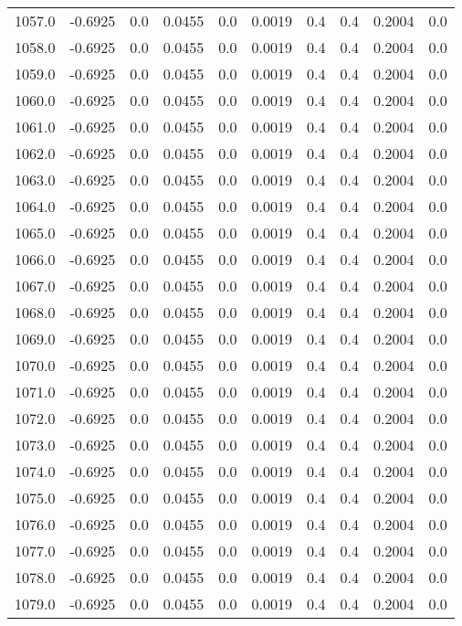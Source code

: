 \begin{longtable}{lrrrrrrrrr}
1057.0 & -0.6925 & 0.0 & 0.0455 & 0.0 & 0.0019 & 0.4 & 0.4 & 0.2004 & 0.0 \\
1058.0 & -0.6925 & 0.0 & 0.0455 & 0.0 & 0.0019 & 0.4 & 0.4 & 0.2004 & 0.0 \\
1059.0 & -0.6925 & 0.0 & 0.0455 & 0.0 & 0.0019 & 0.4 & 0.4 & 0.2004 & 0.0 \\
1060.0 & -0.6925 & 0.0 & 0.0455 & 0.0 & 0.0019 & 0.4 & 0.4 & 0.2004 & 0.0 \\
1061.0 & -0.6925 & 0.0 & 0.0455 & 0.0 & 0.0019 & 0.4 & 0.4 & 0.2004 & 0.0 \\
1062.0 & -0.6925 & 0.0 & 0.0455 & 0.0 & 0.0019 & 0.4 & 0.4 & 0.2004 & 0.0 \\
1063.0 & -0.6925 & 0.0 & 0.0455 & 0.0 & 0.0019 & 0.4 & 0.4 & 0.2004 & 0.0 \\
1064.0 & -0.6925 & 0.0 & 0.0455 & 0.0 & 0.0019 & 0.4 & 0.4 & 0.2004 & 0.0 \\
1065.0 & -0.6925 & 0.0 & 0.0455 & 0.0 & 0.0019 & 0.4 & 0.4 & 0.2004 & 0.0 \\
1066.0 & -0.6925 & 0.0 & 0.0455 & 0.0 & 0.0019 & 0.4 & 0.4 & 0.2004 & 0.0 \\
1067.0 & -0.6925 & 0.0 & 0.0455 & 0.0 & 0.0019 & 0.4 & 0.4 & 0.2004 & 0.0 \\
1068.0 & -0.6925 & 0.0 & 0.0455 & 0.0 & 0.0019 & 0.4 & 0.4 & 0.2004 & 0.0 \\
1069.0 & -0.6925 & 0.0 & 0.0455 & 0.0 & 0.0019 & 0.4 & 0.4 & 0.2004 & 0.0 \\
1070.0 & -0.6925 & 0.0 & 0.0455 & 0.0 & 0.0019 & 0.4 & 0.4 & 0.2004 & 0.0 \\
1071.0 & -0.6925 & 0.0 & 0.0455 & 0.0 & 0.0019 & 0.4 & 0.4 & 0.2004 & 0.0 \\
1072.0 & -0.6925 & 0.0 & 0.0455 & 0.0 & 0.0019 & 0.4 & 0.4 & 0.2004 & 0.0 \\
1073.0 & -0.6925 & 0.0 & 0.0455 & 0.0 & 0.0019 & 0.4 & 0.4 & 0.2004 & 0.0 \\
1074.0 & -0.6925 & 0.0 & 0.0455 & 0.0 & 0.0019 & 0.4 & 0.4 & 0.2004 & 0.0 \\
1075.0 & -0.6925 & 0.0 & 0.0455 & 0.0 & 0.0019 & 0.4 & 0.4 & 0.2004 & 0.0 \\
1076.0 & -0.6925 & 0.0 & 0.0455 & 0.0 & 0.0019 & 0.4 & 0.4 & 0.2004 & 0.0 \\
1077.0 & -0.6925 & 0.0 & 0.0455 & 0.0 & 0.0019 & 0.4 & 0.4 & 0.2004 & 0.0 \\
1078.0 & -0.6925 & 0.0 & 0.0455 & 0.0 & 0.0019 & 0.4 & 0.4 & 0.2004 & 0.0 \\
1079.0 & -0.6925 & 0.0 & 0.0455 & 0.0 & 0.0019 & 0.4 & 0.4 & 0.2004 & 0.0 \\

\end{longtable}
